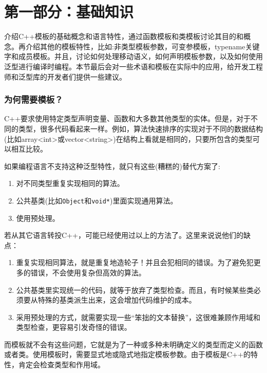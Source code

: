 \pagecolor{mygray}
\color{white}

\part{第一部分：基础知识}

介绍C++模板的基础概念和语言特性，通过函数模板和类模板讨论其目的和概念。再介绍其他的模板特性，比如:非类型模板参数，可变参模板，typename关键字和成员模板。并且，讨论如何处理移动语义，如何声明模板参数，以及如何使用泛型进行编译时编程。本节最后会对一些术语和模板在实际中的应用，给开发工程师和泛型库的开发者们提供一些建议。

\section*{为何需要模板？}

C++要求使用特定类型声明变量、函数和大多数其他类型的实体。但是，对于不同的类型，很多代码看起来一样。例如，算法快速排序的实现对于不同的数据结构(比如array<int>或vector<string>)在结构上看就是相同的，只要所包含的类型可以相互比较。

如果编程语言不支持这种泛型特性，就只有这些(糟糕的)替代方案了:

\begin{enumerate}
  \item 对不同类型重复实现相同的算法。
  \item 公共基类(比如\texttt{Object}和\texttt{void*})里面实现通用算法。
  \item 使用预处理。
\end{enumerate}

若从其它语言转投C++，可能已经使用过以上的方法了。这里来说说他们的缺点：

\begin{enumerate}
  \item 重复实现相同算法，就是重复地造轮子！并且会犯相同的错误。为了避免犯更多的错误，不会使用复杂但高效的算法。

  \item 公共基类里实现统一的代码，就等于放弃了类型检查。而且，有时候某些类必须要从特殊的基类派生出来，这会增加代码维护的成本。

  \item 采用预处理的方式，就需要实现一些“笨拙的文本替换”，这很难兼顾作用域和类型检查，更容易引发奇怪的错误。
\end{enumerate}

而模板就不会有这些问题，它就是为了一种或多种未明确定义的类型而定义的函数或者类。使用模板时，需要显式地或隐式地指定模板参数。由于模板是C++的特性，肯定会检查类型和作用域。

